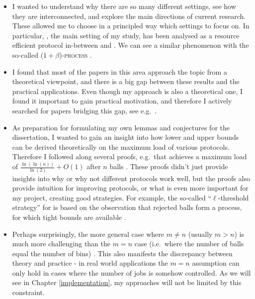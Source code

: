 \begin{itemize}
    \item 
    I wanted to understand why there are so many different settings, see how they are interconnected, and explore the main directions of current research. These allowed me to choose in a principled way which settings to focus on. In particular, \TwoThinning, the main setting of my study, has been analysed as a resource efficient protocol in-between \OneChoice and \TwoChoice. We can see a similar phenomenon with the so-called \textsc{($1+\beta$)-process} \cite{peres2015oneplusbeta}.
    \item
    I found that most of the papers in this area approach the topic from a theoretical viewpoint, and there is a big gap between these results and the practical applications. Even though my approach is also a theoretical one, I found it important to gain practical motivation, and therefore I actively searched for papers bridging this gap, see e.g.\ \cite{wang2017twochoicerouting}.
    \item
    As preparation for formulating my own lemmas and conjectures for the dissertation, I wanted to gain an insight into how lower and upper bounds can be derived theoretically on the maximum load of various protocols. Therefore I followed along several proofs, e.g.\ that \TwoChoice achieves a maximum load of $\frac{\ln(\ln(n))}{\ln(2)} + O(1)$ after $n$ balls \cite{azar1999twochoice}. These proofs didn't just provide insights into why or why not different protocols work well, but the proofs also provide intuition for improving protocols, or what is even more important for my project, creating good strategies. For example, the so-called ``{$\ell$}-threshold strategy'' for \TwoThinning is based on the observation that rejected balls form a \OneChoice process, for which tight bounds are available \cite{feldheim2021thinning}.
    \item
    Perhaps surprisingly, the more general case where $m\neq n$ (usually $m>n$) is much more challenging than the $m=n$ case (i.e.\ where the number of balls equal the number of bins) \cite{berenbrink2006heavilyloaded}. This also manifests the discrepancy between theory and practice - in real world applications the $m=n$ assumption can only hold in cases where the number of jobs is somehow controlled. As we will see in Chapter \ref{implementation}, my approaches will not be limited by this constraint.

\end{itemize}
